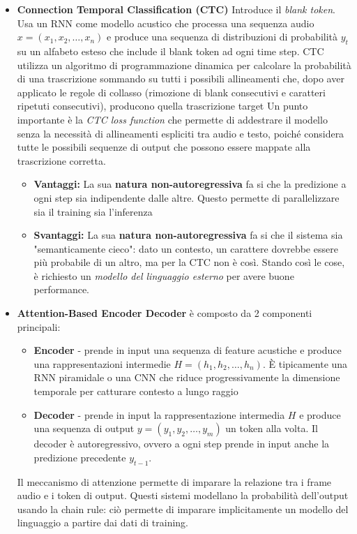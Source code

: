 \documentclass[12pt, a4paper]{article}
\begin{document}
\begin{itemize}
  \item \textbf{Connection Temporal Classification (CTC)} Introduce il \emph{blank token}. Usa un RNN come modello acustico che processa una sequenza audio $x=(x_1, x_2, \dots, x_n)$ e produce una sequenza di distribuzioni di probabilità $y_t$ su un alfabeto esteso che include il blank token ad ogni time step. CTC utilizza un algoritmo di programmazione dinamica per calcolare la probabilità di una trascrizione sommando su tutti i
    possibili allineamenti che, dopo aver applicato le regole di collasso (rimozione di blank consecutivi e caratteri ripetuti consecutivi),
    producono quella trascrizione target
    Un punto importante è la \emph{CTC loss function} che permette di addestrare il modello senza la necessità di allineamenti espliciti tra audio e testo, poiché considera tutte le possibili sequenze di output che possono essere mappate alla trascrizione corretta.
    \begin{itemize}
      \item \textbf{Vantaggi:} La sua \textbf{natura non-autoregressiva} fa si che la predizione a ogni step sia indipendente dalle altre. Questo permette di parallelizzare sia il training sia l'inferenza
      \item \textbf{Svantaggi:} La sua \textbf{natura non-autoregressiva} fa si che il sistema sia "semanticamente cieco": dato un contesto, un carattere dovrebbe essere più probabile di un altro, ma per la CTC non è così. Stando così le cose, è richiesto un \emph{modello del linguaggio esterno} per avere buone performance.
    \end{itemize}
  \item \textbf{Attention-Based Encoder Decoder} è composto da 2 componenti principali:
    \begin{itemize}
      \item \textbf{Encoder} - prende in input una sequenza di feature acustiche e produce una rappresentazioni intermedie $H=(h_1, h_2, \dots, h_n)$. È tipicamente una RNN piramidale o una CNN che riduce progressivamente la dimensione temporale per catturare contesto a
        lungo raggio
      \item \textbf{Decoder} - prende in input la rappresentazione intermedia $H$ e produce una sequenza di output $y=(y_1, y_2, \dots, y_m)$ un token alla volta. Il decoder è autoregressivo, ovvero a ogni step prende in input anche la predizione precedente $y_{t-1}$.
    \end{itemize}
    Il meccanismo di attenzione permette di imparare la relazione tra i frame audio e i token di output. Questi sistemi modellano la probabilità dell'output usando la chain rule: ciò permette di imparare implicitamente un modello del linguaggio a partire dai dati di training.

\end{itemize}
\end{document}
